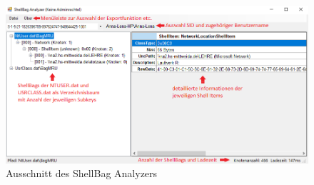 \begin{figure}[H]
	\centering
	\includegraphics[width=1\textwidth]{part/analyzer.png}
	\caption{Ausschnitt des \glqq ShellBag Analyzers\grqq{}} 
	\label{img:analyzer}
\end{figure}

